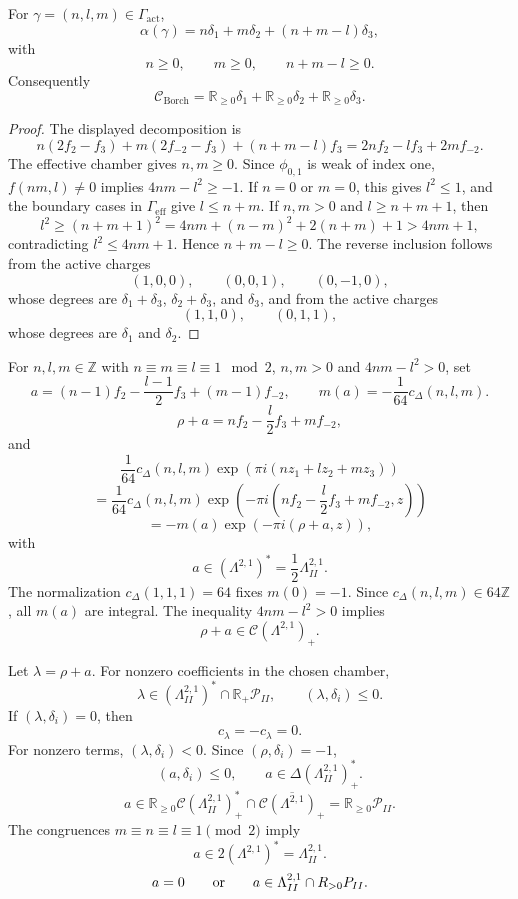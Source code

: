 \documentclass[11pt]{memoir}
\newcommand{\Z}{\mathbb{Z}} \newcommand{\C}{\mathbb{C}}
\newcommand{\R}{\mathbb{R}} \newcommand{\La}{\Lambda}
\newcommand{\Cone}{\mathcal{C}}
\newcommand{\Poly}{\mathcal{P}}
\begin{document}
\begin{lemma}
\label{lem:active-support-type-ii-cone}
For $\gamma=(n,l,m)\in\Gamma_{\mathrm{act}}$,
$$
\alpha(\gamma)
=n\delta_1+m\delta_2+(n+m-l)\delta_3,
$$
with
$$n\ge0,\qquad m\ge0,\qquad n+m-l\ge0.$$
Consequently
$$
\Cone_{\mathrm{Borch}}
=\R_{\geq0}\delta_1+\R_{\geq0}\delta_2+\R_{\geq0}\delta_3.
$$
\end{lemma}

\begin{proof}
The displayed decomposition is
$$
n(2f_2-f_3)+m(2f_{-2}-f_3)+(n+m-l)f_3
=2nf_2-lf_3+2mf_{-2}.
$$
The effective chamber gives $n,m\ge0$.  Since
$\phi_{0,1}$ is weak of index one, $f(nm,l)\ne0$ implies
$4nm-l^2\ge-1$.  If $n=0$ or $m=0$, this gives $l^2\le1$, and the
boundary cases in $\Gamma_{\mathrm{eff}}$ give $l\le n+m$.  If
$n,m>0$ and $l\ge n+m+1$, then
$$
l^2\ge(n+m+1)^2
=4nm+(n-m)^2+2(n+m)+1>4nm+1,
$$
contradicting $l^2\le4nm+1$.  Hence $n+m-l\ge0$.
The reverse inclusion follows from the active charges
$$
(1,0,0),\qquad (0,0,1),\qquad (0,-1,0),
$$
whose degrees are $\delta_1+\delta_3$, $\delta_2+\delta_3$, and
$\delta_3$, and from the active charges
$$
(1,1,0),\qquad (0,1,1),
$$
whose degrees are $\delta_1$ and $\delta_2$.
\end{proof}

For $n,l,m \in \Z$ with $n \equiv m \equiv l \equiv 1 \mod 2$,
$n,m > 0$ and
$4nm - l^2 > 0$, set
$$a = (n-1) f_2 - \frac{l-1}{2} f_3 + (m-1) f_{-2},
\qquad
m(a) = -\frac{1}{64} c_\Delta(n,l,m).$$
$$\rho+a=nf_2-\frac l2f_3+mf_{-2},$$
and
$$\frac{1}{64}c_\Delta(n,l,m)\exp(\pi i (n z_1 + lz_2 + m z_3)) $$
$$= \frac{1}{64} c_\Delta(n,l,m)
\exp\left(- \pi i\left(nf_2-\frac{l}{2}f_3+mf_{-2}, z\right)\right)$$
$$= -m(a) \exp (-\pi i(\rho +a, z)),$$
with
$$a\in(\La^{2,1})^*=\frac{1}{2}\La^{2,1}_{II}.$$
The normalization $c_\Delta(1,1,1)=64$ fixes $m(0)=-1$.  Since
$c_\Delta(n,l,m)\in64\Z$, all $m(a)$ are integral.  The inequality
$4nm-l^2>0$ implies
$$\rho+a\in \Cone(\La^{2,1})_+.$$

Let $\lambda=\rho+a$.  For nonzero coefficients in the chosen chamber,
$$\lambda\in(\La^{2,1}_{II})^*\cap\R_+\Poly_{II},\qquad
(\lambda,\delta_i)\leq0.$$
If $(\lambda,\delta_i)=0$, then
$$c_\lambda=-c_\lambda=0.$$
For nonzero terms, $(\lambda,\delta_i)<0$.  Since
$(\rho,\delta_i)=-1$,
$$(a,\delta_i)\leq0,\qquad
a\in\Delta(\La^{2,1}_{II})^*_+.$$
$$a \in \R_{\geq 0} \Cone(\La^{2,1}_{II})_+^* \cap
\overline{\Cone(\La^{2,1})_+} = \R_{\geq 0} \Poly_{II}.$$
The congruences $m\equiv n\equiv l\equiv1\pmod2$ imply
$$a\in 2(\La^{2,1})^*=\La^{2,1}_{II}.$$
$$a=0\qquad\hbox{or}\qquad
a\in\La^{2,1}_{II}\cap\R_{>0}\Poly_{II}.$$
\end{document}

